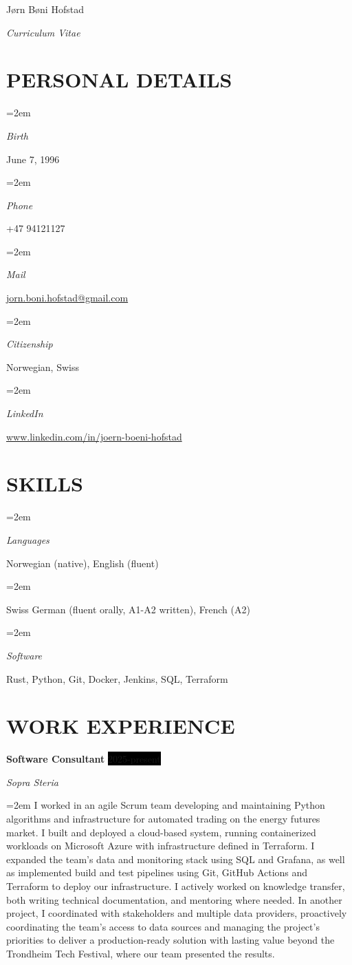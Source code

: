 \documentclass[paper=a4,fontsize=11pt,norsk]{scrartcl} %
\newlength{\spacebox}
\newcommand{\sepspace}{\vspace*{1em}}		%
\newcommand{\MyName}[1]{ %
		\Huge \usefont{OT1}{phv}{b}{n} \hfill #1
		\par \normalsize \normalfont}
\newcommand{\MySlogan}[1]{ %
		\large \usefont{OT1}{phv}{m}{n}\hfill \textit{#1}
		\par \normalsize \normalfont}
\newcommand{\NewPart}[1]{\section*{\uppercase{#1}}}
\newcommand{\PersonalEntry}[2]{
		\noindent\hangindent=2em\hangafter=0 %
		\parbox{\spacebox}{        %
		\textit{#1}}		       %
		\hspace{1.5em} #2 \par}    %
\newcommand{\SkillsEntry}[2]{      %
		\noindent\hangindent=2em\hangafter=0 %
		\parbox{\spacebox}{        %
		\textit{#1}}			   %
		\hspace{1.5em} #2 \par}    %
\newcommand{\EducationEntry}[4]{
		\noindent \textbf{#1} \hfill      %
		\colorbox{Black}{%
			\parbox{6em}{%
			\hfill\color{White}#2}} \par  %
		\noindent \textit{#3} \par        %
		\noindent\hangindent=2em\hangafter=0 \small #4 %
		\normalsize \par}
\newcommand{\WorkEntry}[4]{				  %
		\noindent \textbf{#1} \hfill      %
		\colorbox{Black}{\color{White}#2} \par  %
		\noindent \textit{#3} \par              %
		\noindent\hangindent=2em\hangafter=0 \small #4 %
		\normalsize \par}
\begin{document}

\MyName{Jørn Bøni Hofstad}
\MySlogan{Curriculum Vitae}

\sepspace

\NewPart{Personal details}{}

\PersonalEntry{Birth}{June 7, 1996}
\PersonalEntry{Phone}{+47 94121127}
\PersonalEntry{Mail}{\url{jorn.boni.hofstad@gmail.com}}
\PersonalEntry{Citizenship}{Norwegian, Swiss}
\PersonalEntry{LinkedIn}{\url{www.linkedin.com/in/joern-boeni-hofstad}}


\NewPart{Skills}{}

\SkillsEntry{Languages}{Norwegian (native), English (fluent)}
\SkillsEntry{}{Swiss German (fluent orally, A1-A2 written), French (A2)}

\SkillsEntry{Software}{Rust, Python, Git, Docker, Jenkins, SQL, Terraform}

\NewPart{Work experience}{}

\WorkEntry{Software Consultant}{2025-present}{Sopra Steria}{I
worked in an agile Scrum team developing and maintaining Python
algorithms and infrastructure for automated trading on the energy
futures market. I built and deployed a cloud-based system,
running containerized workloads on Microsoft Azure with
infrastructure defined in Terraform. I expanded the team's data
and monitoring stack using SQL and Grafana, as well as
implemented build and test pipelines using Git, GitHub Actions
and Terraform to deploy our infrastructure. I actively worked on
knowledge transfer, both writing technical documentation, and
mentoring where needed. In another project, I coordinated with
stakeholders and multiple data providers, proactively
coordinating the team's access to data sources and managing the
project's priorities to deliver a production-ready solution with
lasting value beyond the Trondheim Tech Festival, where our team
presented the results.
}
\end{document}
